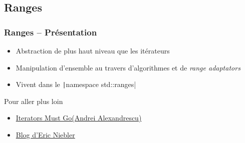 \documentclass[C++.tex]{subfiles}
\begin{document}
\subsection*{Ranges}
\begin{frame}
	\frametitle{Ranges -- Présentation}
	\begin{itemize}
		\item Abstraction de plus haut niveau que les itérateurs
		\item Manipulation d'ensemble au travers d'algorithmes et de \textit{range adaptators}
		\item Vivent dans le \texttt|namespace std::ranges|

	\end{itemize}

	\begin{block}{Pour aller plus loin}
		\begin{itemize}
			\item \href{https://accu.org/content/conf2009/AndreiAlexandrescu_iterators-must-go.pdf}{Iterators Must Go\linklogo (Andrei Alexandrescu)}


			\item \href{http://ericniebler.com/}{Blog d'Eric Niebler\linklogo}
		\end{itemize}
	\end{block}
\end{frame}
\end{document}
